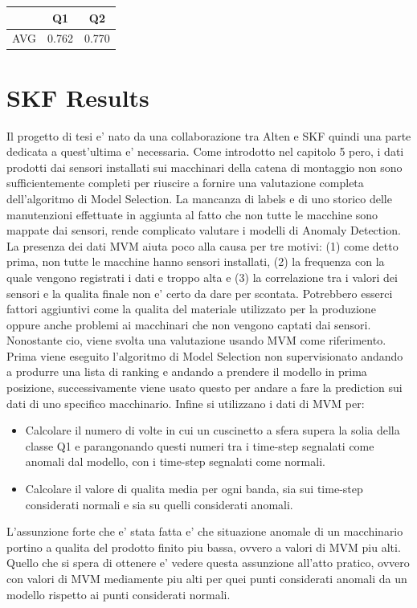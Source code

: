 \begin{table}[]
\begin{tabular}{|l|l|l|}
\hline
    & \multicolumn{1}{c|}{Q1} & \multicolumn{1}{c|}{Q2} \\ \hline
AVG & 0.762                   & 0.770                   \\ \hline
\end{tabular}
\end{table}

\section{SKF Results}
Il progetto di tesi e' nato da una collaborazione tra Alten e SKF quindi una parte dedicata a quest'ultima e' necessaria. Come introdotto nel capitolo 5 pero, i dati prodotti dai sensori installati sui macchinari della catena di montaggio non sono sufficientemente completi per riuscire a fornire una valutazione completa dell'algoritmo di Model Selection. La mancanza di labels e di uno storico delle manutenzioni effettuate in aggiunta al fatto che non tutte le macchine sono mappate dai sensori, rende complicato valutare i modelli di Anomaly Detection. La presenza dei dati MVM aiuta poco alla causa per tre motivi: (1) come detto prima, non tutte le macchine hanno sensori installati, (2) la frequenza con la quale vengono registrati i dati e troppo alta e (3) la correlazione tra i valori dei sensori e la qualita finale non e' certo da dare per scontata. Potrebbero esserci fattori aggiuntivi come la qualita del materiale utilizzato per la produzione oppure anche problemi ai macchinari che non vengono captati dai sensori. 
Nonostante cio, viene svolta una valutazione usando MVM come riferimento. Prima viene eseguito l'algoritmo di Model Selection non supervisionato andando a produrre una lista di ranking e andando a prendere il modello in prima posizione, successivamente viene usato questo per andare a fare la prediction sui dati di uno specifico macchinario. Infine si utilizzano i dati di MVM per:
\begin{itemize}
\item Calcolare il numero di volte in cui un cuscinetto a sfera supera la solia della classe Q1 e parangonando questi numeri tra i time-step segnalati come anomali dal modello, con i time-step segnalati come normali.
\item Calcolare il valore di qualita media per ogni banda, sia sui time-step considerati normali e sia su quelli considerati anomali.
\end{itemize}
L'assunzione forte che e' stata fatta e' che situazione anomale di un macchinario portino a qualita del prodotto finito piu bassa, ovvero a valori di MVM piu alti. Quello che si spera di ottenere e' vedere questa assunzione all'atto pratico, ovvero con valori di MVM mediamente piu alti per quei punti considerati anomali da un modello rispetto ai punti considerati normali.


